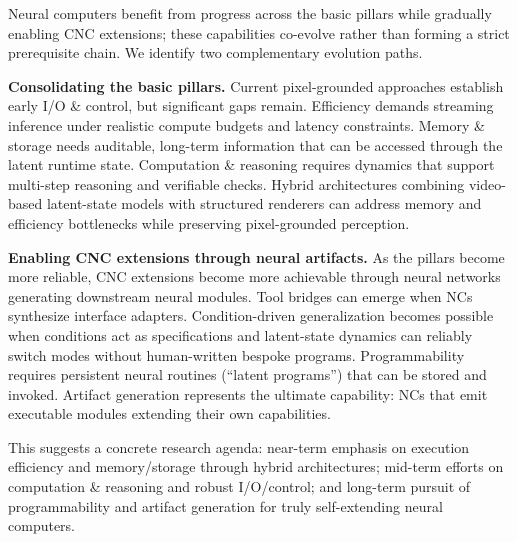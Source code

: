 Neural computers benefit from progress across the basic pillars while gradually enabling CNC extensions; these capabilities co-evolve rather than forming a strict prerequisite chain. We identify two complementary evolution paths.

\noindent\textbf{Consolidating the basic pillars.} Current pixel-grounded approaches establish early I/O \& control, but significant gaps remain. Efficiency demands streaming inference under realistic compute budgets and latency constraints. Memory \& storage needs auditable, long-term information that can be accessed through the latent runtime state. Computation \& reasoning requires dynamics that support multi-step reasoning and verifiable checks. Hybrid architectures combining video-based latent-state models with structured renderers can address memory and efficiency bottlenecks while preserving pixel-grounded perception.

\noindent\textbf{Enabling CNC extensions through neural artifacts.} As the pillars become more reliable, CNC extensions become more achievable through neural networks generating downstream neural modules. Tool bridges can emerge when NCs synthesize interface adapters. Condition-driven generalization becomes possible when conditions act as specifications and latent-state dynamics can reliably switch modes without human-written bespoke programs. Programmability requires persistent neural routines (``latent programs'') that can be stored and invoked. Artifact generation represents the ultimate capability: NCs that emit executable modules extending their own capabilities.

This suggests a concrete research agenda: near-term emphasis on execution efficiency and memory/storage through hybrid architectures; mid-term efforts on computation \& reasoning and robust I/O/control; and long-term pursuit of programmability and artifact generation for truly self-extending neural computers.
